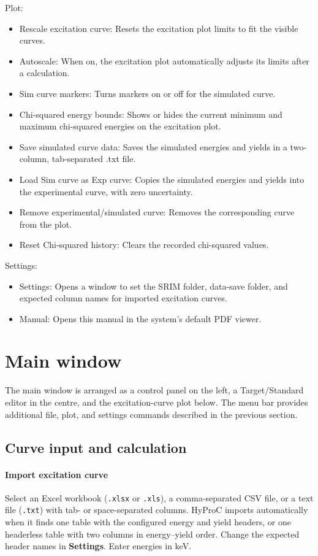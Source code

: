 \documentclass[11pt,a4paper]{article}
\begin{document}
Plot:
\vspace{-\parskip}
\begin{itemize}
    \item Rescale excitation curve: Resets the excitation plot limits to fit the visible curves.
    \item Autoscale: When on, the excitation plot automatically adjusts its limits after a calculation.
    \item Sim curve markers: Turns markers on or off for the simulated curve.
    \item Chi-squared energy bounds: Shows or hides the current minimum and maximum chi-squared energies on the excitation plot.
    \item Save simulated curve data: Saves the simulated energies and yields in a two-column, tab-separated .txt file.
    \item Load Sim curve as Exp curve: Copies the simulated energies and yields into the experimental curve, with zero uncertainty.
    \item Remove experimental/simulated curve: Removes the corresponding curve from the plot.
    \item Reset Chi-squared history: Clears the recorded chi-squared values.
\end{itemize}

Settings:
\vspace{-\parskip}
\begin{itemize}
    \item Settings: Opens a window to set the SRIM folder, data-save folder, and expected column names for imported excitation curves.
    \item Manual: Opens this manual in the system's default PDF viewer.
\end{itemize}

\section{Main window}
The main window is arranged as a control panel on the left, a Target/Standard editor in the centre, and the excitation-curve plot below. The menu bar provides additional file, plot, and settings commands described in the previous section.

\subsection{Curve input and calculation}
\paragraph{Import excitation curve}
Select an Excel workbook (\texttt{.xlsx} or \texttt{.xls}), a comma-separated CSV file, or a text file (\texttt{.txt}) with tab- or space-separated columns. HyProC imports automatically when it finds one table with the configured energy and yield headers, or one headerless table with two columns in energy--yield order. Change the expected header names in \textbf{Settings}. Enter energies in keV.
\end{document}
